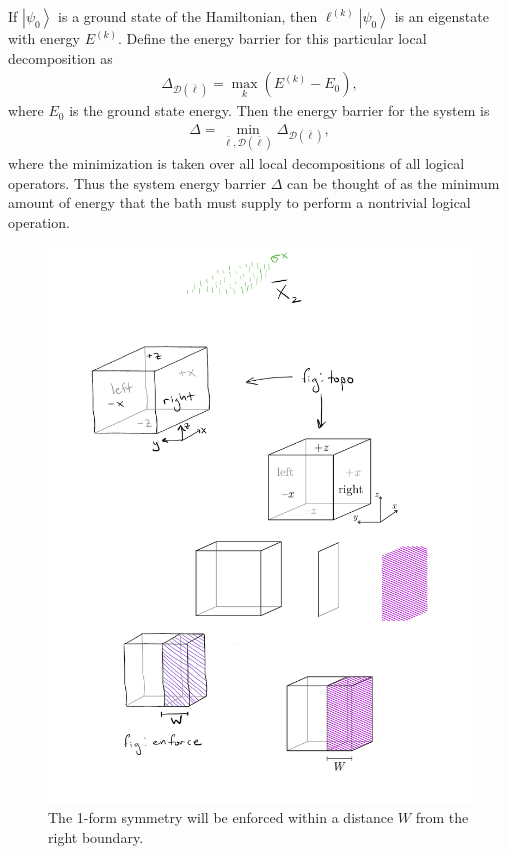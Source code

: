 \documentclass[twocolumn, longbibliography]{revtex4-2}
\renewcommand{\l}{\ell}
\newcommand{\ket}[1]{\left|#1\right\rangle}
\begin{document}
If $\ket{\psi_0}$ is a ground state of the Hamiltonian, then $\l^{(k)}\ket{\psi_0}$ is an eigenstate with energy $E^{(k)}$. Define the energy barrier for this particular local decomposition as
\begin{align}
\Delta_{\mathcal{D}(\bar{\l})}=\max_k(E^{(k)}-E_0),
\end{align}
where $E_0$ is the ground state energy. Then the energy barrier for the system is
\begin{align}
\Delta = \min_{\bar{\l},\mathcal{D}(\bar{\l})}\Delta_{\mathcal{D}(\bar{\l})},
\end{align}
where the minimization is taken over all local decompositions of all logical operators. Thus the system energy barrier $\Delta$ can be thought of as the minimum amount of energy that the bath must supply to perform a nontrivial logical operation.

\begin{figure}
\centering
\includegraphics{enforce}
\caption{The 1-form symmetry will be enforced within a distance $W$ from the right boundary.}
\label{fig:enforce}
\end{figure}
	
\end{document}
